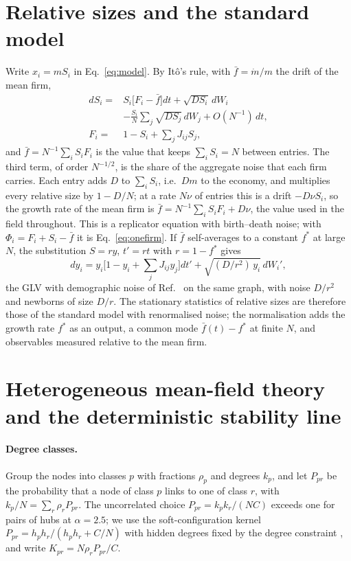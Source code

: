 \documentclass[pre,twocolumn,superscriptaddress,nofootinbib]{revtex4-2}
\begin{document}
\appendix

\section{Relative sizes and the standard model}
\label{app:relative}

Write $x_i=mS_i$ in Eq.~\eqref{eq:model}.  By It\^o's rule, with $\bar f=\dot m/m$ the drift of the
mean firm,
\begin{align}
dS_i={}&S_i\big[F_i-\bar f\big]dt+\sqrt{DS_i}\,dW_i\nonumber\\
&-\frac{S_i}{N}\sum_j\sqrt{DS_j}\,dW_j+O(N^{-1})\,dt,\nonumber\\
F_i={}&1-S_i+\sum_jJ_{ij}S_j ,
\label{eq:app-rel}
\end{align}
and $\bar f=N^{-1}\sum_iS_iF_i$ is the value that keeps $\sum_iS_i=N$ between entries.  The third term, of order
$N^{-1/2}$, is the share of the aggregate noise that each firm carries.  Each entry adds $D$ to $\sum_iS_i$, i.e.\
$Dm$ to the economy, and multiplies every relative size by $1-D/N$; at a rate $N\nu$ of entries this is a drift
$-D\nu S_i$, so the growth rate of the mean firm is $\bar f=N^{-1}\sum_iS_iF_i+D\nu$, the value used in the field
throughout.  This is a replicator equation
with birth--death noise; with $\Phi_i=F_i+S_i-\bar f$ it is Eq.~\eqref{eq:onefirm}.  If $\bar f$ self-averages to a constant
$f^*$ at large $N$, the substitution $S=ry$, $t'=rt$ with $r=1-f^*$ gives
\begin{equation}
dy_i=y_i\Big[1-y_i+\sum_jJ_{ij}y_j\Big]dt'+\sqrt{(D/r^2)\,y_i}\,dW_i' ,
\end{equation}
the GLV with demographic noise of Ref.~\cite{altieri2021} on the same graph, with noise $D/r^2$ and newborns
of size $D/r$.  The
stationary statistics of relative sizes are therefore those of the standard model with renormalised
noise; the normalisation adds the growth rate $f^*$ as an output, a common mode $\bar f(t)-f^*$ at
finite $N$, and observables measured relative to the mean firm.

\section{Heterogeneous mean-field theory and the deterministic stability line}
\label{app:hdmft}

\paragraph{Degree classes.}  Group the nodes into classes $p$ with fractions $\rho_p$ and degrees
$k_p$, and let $P_{pr}$ be the probability that a node of class $p$ links to one of class $r$, with
$k_p/N=\sum_r\rho_rP_{pr}$.  The uncorrelated choice $P_{pr}=k_pk_r/(NC)$ exceeds one for pairs of hubs
at $\alpha=2.5$; we use the soft-configuration kernel $P_{pr}=h_ph_r/(h_ph_r+C/N)$ with hidden degrees fixed
by the degree constraint \cite{patil2026}, and write $K_{pr}=N\rho_rP_{pr}/C$.
\end{document}
